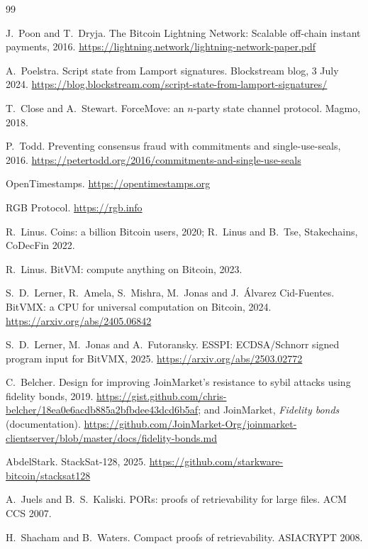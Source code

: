 \documentclass[11pt]{article}
\begin{document}
\begin{thebibliography}{99}

 J.~Poon and T.~Dryja. The Bitcoin Lightning Network: Scalable off-chain instant payments, 2016. \url{https://lightning.network/lightning-network-paper.pdf}

 A.~Poelstra. Script state from Lamport signatures. Blockstream blog, 3 July 2024. \url{
https://blog.blockstream.com/script-state-from-lamport-signatures/}

 T.~Close and A.~Stewart. ForceMove: an $n$-party state channel protocol. Magmo, 2018.

 P.~Todd. Preventing consensus fraud with commitments and single-use-seals, 2016. \url{https://petertodd.org/2016/commitments-and-single-use-seals}

 OpenTimestamps. \url{https://opentimestamps.org}

 RGB Protocol. \url{https://rgb.info}

 R.~Linus. Coins: a billion Bitcoin users, 2020; R.~Linus and B.~Tse, Stakechains, CoDecFin 2022.

 R.~Linus. BitVM: compute anything on Bitcoin, 2023.

 S.~D.~Lerner, R.~Amela, S.~Mishra, M.~Jonas and J.~\'Alvarez Cid-Fuentes. BitVMX: a CPU for universal computation on Bitcoin, 2024. \url{https://arxiv.org/abs/2405.06842}

 S.~D.~Lerner, M.~Jonas and A.~Futoransky. ESSPI: ECDSA/Schnorr signed program input for BitVMX, 2025. \url{https://arxiv.org/abs/2503.02772}

 C.~Belcher. Design for improving JoinMarket's resistance to sybil attacks using fidelity bonds, 2019. \url{https://gist.github.com/chris-belcher/18ea0e6acdb885a2bfbdee43dcd6b5af}; and JoinMarket, \emph{Fidelity bonds} (documentation). \url{https://github.com/JoinMarket-Org/joinmarket-clientserver/blob/master/docs/fidelity-bonds.md}

 AbdelStark. StackSat-128, 2025. \url{https://github.com/starkware-bitcoin/stacksat128}

 A.~Juels and B.~S.~Kaliski. PORs: proofs of retrievability for large files. ACM CCS 2007.

 H.~Shacham and B.~Waters. Compact proofs of retrievability. ASIACRYPT 2008.


\end{thebibliography}
\end{document}
